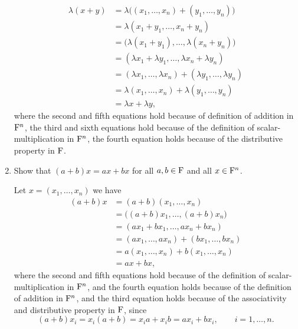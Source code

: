 \begin{enumerate}
\begin{solution}
            \begin{align*}
                \lambda (x + y) &= \lambda \big( (x_1,\ldots,x_n) + (y_1, \ldots, y_n)\big) \\
                                &= \lambda (x_1+y_1, \ldots, x_n+y_n) \\
                                &= \big(\lambda(x_1+y_1), \ldots, \lambda(x_n+y_n)\big) \\
                                &= (\lambda x_1 + \lambda y_1, \ldots, \lambda x_n + \lambda y_n) \\
                                &= (\lambda x_1, \ldots, \lambda x_n) + (\lambda y_1, \ldots, \lambda y_n) \\
                                &= \lambda (x_1, \ldots, x_n) + \lambda (y_1, \ldots, y_n) \\
                                &= \lambda x + \lambda y, 
            \end{align*}
            where the second and fifth equations hold because of definition of addition in $\mathrm{F}^n$, 
            the third and sixth equations hold because of the definition of scalar-multiplication in $\mathrm{F}^n$,
            the fourth equation holds because of the distributive property in $\mathrm{F}$.
        \end{solution}
    \item Show that $(a+b)x = ax + bx$ for all $a,b \in \mathrm{F}$ and all $x \in \mathrm{F}^n$.
        \begin{solution}
            Let $x = (x_1, \ldots, x_n)$ we have 
            \begin{align*}
                (a + b) x &= (a+b)(x_1, \ldots, x_n) \\
                          &= \big( (a+b)x_1, \ldots, (a+b)x_n\big) \\
                          &= (ax_1 + bx_1, \ldots, ax_n + bx_n) \\
                          &= (ax_1, \ldots, ax_n) + (bx_1, \ldots, bx_n) \\
                          &= a(x_1, \ldots, x_n) + b(x_1, \ldots, x_n) \\
                          &= ax + bx,
            \end{align*}
            where the second and fifth equations hold because of the definition of scalar-multiplication in $\mathrm{F}^n$, 
            and the fourth equation holds because of the definition of addition in $\mathrm{F}^n$,
            and the third equation holds because of the associativity and distributive property in $\mathrm{F}$, since 
            \[ (a+b)x_i = x_i(a+b) = x_ia + x_ib = ax_i + bx_i, \qquad i = 1, \ldots, n.\]
        \end{solution}
\end{enumerate}

